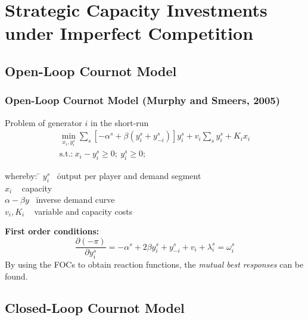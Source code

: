 \section{Strategic Capacity Investments under Imperfect Competition}

\subsection{Open-Loop Cournot Model}

\begin{frame}
					
\frametitle{Open-Loop Cournot Model (Murphy and Smeers, 2005)}

\begin{beamerboxesrounded}
{Problem of generator $i$ in the \alert{short-run}}
\begin{gather}
	\min_{x_i,y_i^s} \sum_s \left[ - \alpha^s + \beta (y_i^s+y_{-i}^s) \right] y_i^s + v_i \sum_s y_i^s + K_i x_i \\
\text{s.t.:} \  x_i-y_i^s \geq 0; \  y_i^s \geq 0; \ \nonumber
\end{gather}
{\small
\begin{tabbing}
whereby: \= $y_i^s$ \  \= output per player and demand segment \\
\> $x_i$   \    \> capacity  \\
\> $\alpha - \beta y$    \   \= inverse demand curve \\
\> $v_i, K_i$    \    \> variable and capacity costs
\end{tabbing}}
\end{beamerboxesrounded}
\vspace{0.3cm}
\textbf{First order conditions:}
\begin{equation}
	\frac{\partial (- \pi)}{\partial y_i^s} = -\alpha^s + 2 \beta y_i^s +  y_{-i}^s + v_i + \lambda_i^s = \omega_i^s 
\end{equation}
By using the FOCs to obtain reaction functions, the \emph{mutual best responses} can be found.
\end{frame}

\subsection{Closed-Loop Cournot Model}

